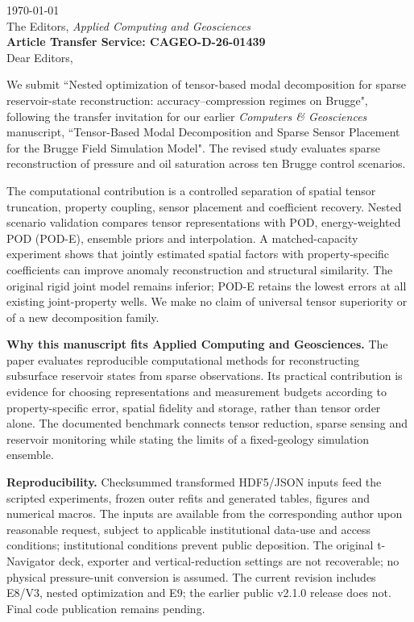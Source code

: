 \documentclass[11pt,a4paper]{article}
\begin{document}
\noindent \today\\[2mm]
The Editors, \emph{Applied Computing and Geosciences}\\[2mm]
\textbf{Article Transfer Service: CAGEO-D-26-01439}\\[2mm]
Dear Editors,

We submit ``Nested optimization of tensor-based modal decomposition for sparse reservoir-state reconstruction: accuracy--compression regimes on Brugge", following the transfer invitation for our earlier \emph{Computers \& Geosciences} manuscript, ``Tensor-Based Modal Decomposition and Sparse Sensor Placement for the Brugge Field Simulation Model". The revised study evaluates sparse reconstruction of pressure and oil saturation across ten Brugge control scenarios.

The computational contribution is a controlled separation of spatial tensor truncation, property coupling, sensor placement and coefficient recovery. Nested scenario validation compares tensor representations with POD, energy-weighted POD (POD-E), ensemble priors and interpolation. A matched-capacity experiment shows that jointly estimated spatial factors with property-specific coefficients can improve anomaly reconstruction and structural similarity. The original rigid joint model remains inferior; POD-E retains the lowest errors at all existing joint-property wells. We make no claim of universal tensor superiority or of a new decomposition family.

\textbf{Why this manuscript fits Applied Computing and Geosciences.} The paper evaluates reproducible computational methods for reconstructing subsurface reservoir states from sparse observations. Its practical contribution is evidence for choosing representations and measurement budgets according to property-specific error, spatial fidelity and storage, rather than tensor order alone. The documented benchmark connects tensor reduction, sparse sensing and reservoir monitoring while stating the limits of a fixed-geology simulation ensemble.

\textbf{Reproducibility.} Checksummed transformed HDF5/JSON inputs feed the scripted experiments, frozen outer refits and generated tables, figures and numerical macros. The inputs are available from the corresponding author upon reasonable request, subject to applicable institutional data-use and access conditions; institutional conditions prevent public deposition. The original t-Navigator deck, exporter and vertical-reduction settings are not recoverable; no physical pressure-unit conversion is assumed. The current revision includes E8/V3, nested optimization and E9; the earlier public v2.1.0 release does not. Final code publication remains pending.
\end{document}
